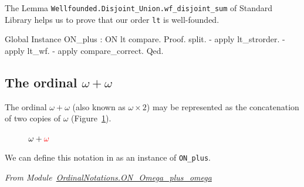 \documentclass[a4paper]{book}
\begin{document}
The Lemma \texttt{Wellfounded.Disjoint\_Union.wf\_disjoint\_sum} of Standard Library
helps us to prove that our order \texttt{lt} is well-founded.


\begin{Coqsrc}
Global Instance ON_plus : ON lt compare.
Proof.
  split.
  - apply lt_strorder.
  -  apply lt_wf.
  - apply compare_correct.
Qed.
\end{Coqsrc}






\subsection{The ordinal \texorpdfstring{$\omega+\omega$}{omega + omega}}

The ordinal $\omega+\omega$ (also known as $\omega\times 2$) may be represented as the concatenation 
of two copies of $\omega$ (Figure~\ref{fig:omega-plus-omega}).

\begin{figure}[h]
   \centering
   \caption{\textcolor{blue}{$\omega+{\color{red}\omega}$}}
   \label{fig:omega-plus-omega}
 \end{figure}

We can define this notation in \coq{} as an instance of \texttt{ON\_plus}.


\vspace{4pt}
\noindent\emph{From Module~\href{../src/html/hydras.OrdinalNotations.ON_Omega_plus_omega.html}{OrdinalNotations.ON\_Omega\_plus\_omega}}
\end{document}
